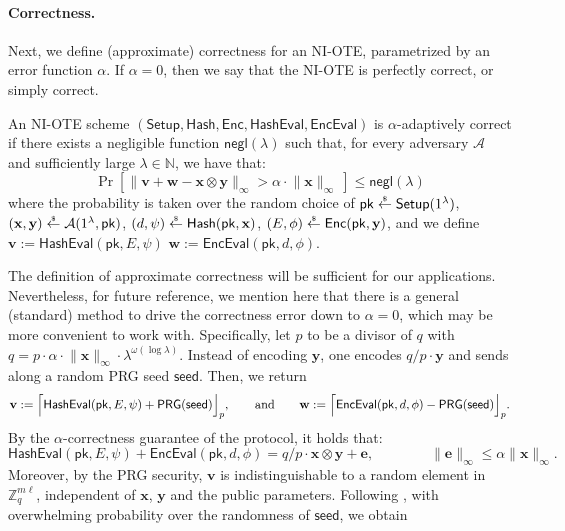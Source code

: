 \documentclass{theoretics}
\newcommand{\getsr}{\overset{\raisebox{-1pt}{$\scriptscriptstyle \$$}}{\gets}}
\newcommand{\sample}{\getsr}
\newcommand{\N}{\mathbb{N}}
\newcommand{\Z}{\mathbb{Z}}
\newcommand{\negl}{\mathsf{negl}}
\renewcommand{\sec}{\ensuremath{\lambda}}
\newcommand{\Adv}{\mathcal{A}}
\newcommand{\algofont}[1]{\ensuremath{\mathsf{#1}}}
\newcommand{\Enc}{{\algofont{Enc}}}
\newcommand{\Setup}{{\algofont{Setup}}}
\newcommand{\Eval}{\algofont{Eval}\xspace}
\newcommand{\Hash}{{\algofont{Hash}}}
\newcommand{\pk}{{\mathsf{pk}}}
\newcommand\bbbone{1}
\begin{document}
\paragraph{Correctness.} Next, we define (approximate) correctness for an NI-OTE, parametrized by an error function $\alpha$. If $\alpha = 0$, then we say that the NI-OTE is perfectly correct, or simply correct.
{
\begin{definition}\label{def:alphacorrect}
An NI-OTE scheme $(\Setup, \allowbreak \Hash,  \allowbreak \Enc,  \allowbreak \Hash\Eval,  \allowbreak \Enc\Eval)$ is $\alpha$-adaptively correct if 
there exists a negligible function $\negl(\sec)$ such that, for every adversary $\Adv$ and sufficiently large $\sec\in\N$, we have that:
\[
\Pr\left[\lVert\mathbf{v}+\mathbf{w}-\mathbf{x}\otimes \mathbf{y}\rVert_\infty>\alpha\cdot\lVert \mathbf{x}\rVert_\infty\ \right] \leq \negl(\sec)
\]
where the probability is taken over the random choice of $\pk\sample\Setup(\bbbone^\sec)$, $(\mathbf{x}, \mathbf{y})\sample\Adv(1^\sec, \pk)$, $(d, \psi)\sample\Hash(\pk, \mathbf{x})$, $(E, \phi)\sample\Enc(\pk, \mathbf{y})$, and we define $\mathbf{v}:= \Hash\Eval(\pk, E, \psi)$ $\mathbf{w}:= \Enc\Eval(\pk, d, \phi)$.
\end{definition}
%
The definition of approximate correctness will be sufficient for our applications. Nevertheless, for future reference, we mention here that there is a general (standard) method to drive the correctness error down to $\alpha = 0$, which may be more convenient to work with. Specifically, let $p$ to be a divisor of $q$ with $q= p\cdot \alpha\cdot\lVert \mathbf{x}\rVert_\infty\cdot\lambda^{\omega(\log \lambda)}$. Instead of encoding $\mathbf{y}$, one encodes $q/p \cdot \mathbf{y}$ and sends along a random PRG seed $\mathsf{seed}$. Then, we return \[\mathbf{v}:=\Bigl\lceil\Hash\Eval(\pk, E, \psi)+\mathsf{PRG}(\mathsf{seed})\Bigr\rfloor_p, \qquad\text{and}\qquad \mathbf{w}:=\Bigl\lceil\Enc\Eval(\pk, d, \phi)-\mathsf{PRG}(\mathsf{seed})\Bigr\rfloor_p.\] 
By the $\alpha$-correctness guarantee of the protocol, it holds that:
\[
\Hash\Eval(\pk, E, \psi) + \Enc\Eval(\pk, d, \phi) = q/p \cdot \mathbf{x} \otimes \mathbf{y} +\mathbf{e}, \qquad \qquad \lVert\mathbf{e}\rVert_\infty\le \alpha\lVert \mathbf{x}\rVert_\infty.
\]
Moreover, by the PRG security, $\mathbf{v}$ is indistinguishable to a random element in $\Z_q^{m\ell}$, independent of $\mathbf{x}$, $\mathbf{y}$ and the public parameters. Following \cite{C:DHRW16}, with overwhelming probability over the randomness of $\mathsf{seed}$, we obtain
}
\end{document}
